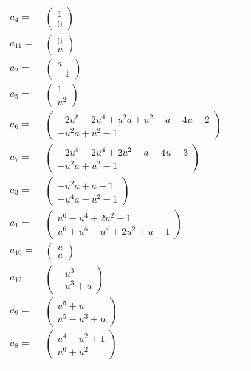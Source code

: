 \documentclass[1p]{elsarticle_modified}
\theoremstyle{definition}
\begin{document}
\begin{tabular}{m{7pt} m{180pt} m{7pt} m{180pt} }
\flushright $a_{4}=$&$\begin{pmatrix}1\\0\end{pmatrix}$ \\
\flushright $a_{11}=$&$\begin{pmatrix}0\\u\end{pmatrix}$ \\
\flushright $a_{2}=$&$\begin{pmatrix}a\\-1\end{pmatrix}$ \\
\flushright $a_{5}=$&$\begin{pmatrix}1\\u^2\end{pmatrix}$ \\
\flushright $a_{6}=$&$\begin{pmatrix}-2 u^5-2 u^4+u^2 a+u^2- a-4 u-2\\- u^2 a+u^2-1\end{pmatrix}$ \\
\flushright $a_{7}=$&$\begin{pmatrix}-2 u^5-2 u^4+2 u^2- a-4 u-3\\- u^2 a+u^2-1\end{pmatrix}$ \\
\flushright $a_{3}=$&$\begin{pmatrix}- u^2 a+a-1\\- u^4 a- u^2-1\end{pmatrix}$ \\
\flushright $a_{1}=$&$\begin{pmatrix}u^6- u^4+2 u^2-1\\u^6+u^5- u^4+2 u^2+u-1\end{pmatrix}$ \\
\flushright $a_{10}=$&$\begin{pmatrix}u\\u\end{pmatrix}$ \\
\flushright $a_{12}=$&$\begin{pmatrix}- u^3\\- u^3+u\end{pmatrix}$ \\
\flushright $a_{9}=$&$\begin{pmatrix}u^5+u\\u^5- u^3+u\end{pmatrix}$ \\
\flushright $a_{8}=$&$\begin{pmatrix}u^4- u^2+1\\u^6+u^2\end{pmatrix}$\\&\end{tabular}
\end{document}
